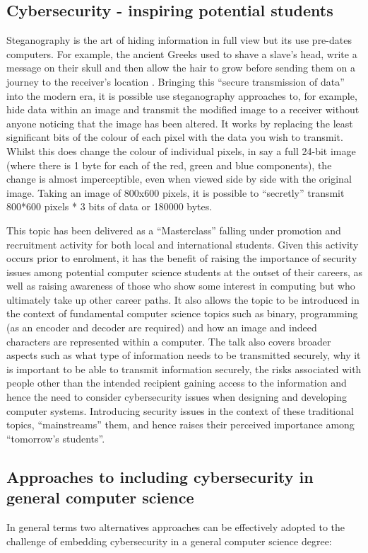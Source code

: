 \documentclass[conference]{IEEEtran}
\begin{document}
\subsection{Cybersecurity - inspiring potential students}\label{sec:third} %
Steganography is the art of hiding information in full view but its use pre-dates computers.  For example, the ancient Greeks used to shave a slave’s head, write a message on their skull and then allow the hair to grow before sending them on a journey to the receiver’s location \cite{Herodotus440}.  Bringing this ``secure transmission of data'' into the modern era, it is possible use steganography approaches to, for example, hide data within an image and transmit the modified image to a receiver without anyone noticing that the image has been altered.  It works by replacing the least significant bits of the colour of each pixel with the data you wish to transmit.  Whilst this does change the colour of individual pixels, in say a full 24-bit image (where there is 1 byte for each of the red, green and blue components), the change is almost imperceptible, even when viewed side by side with the original image.  Taking an image of 800x600 pixels, it is possible to ``secretly'' transmit 800*600 pixels * 3 bits of data or 180000 bytes.

This topic has been delivered as a ``Masterclass'' falling under promotion and recruitment activity for both local and international students.  Given this activity occurs prior to enrolment, it has the benefit of raising the importance of security issues among potential computer science students at the outset of their careers, as well as raising awareness of those who show some interest in computing but who ultimately take up other career paths.  It also allows the topic to be introduced in the context of fundamental computer science topics such as binary, programming (as an encoder and decoder are required) and how an image and indeed characters are represented within a computer.  The talk also covers broader aspects such as what type of information needs to be transmitted securely, why it is important to be able to transmit information securely, the risks associated with people other than the intended recipient gaining access to the information and hence the need to consider cybersecurity issues when designing and developing computer systems.  Introducing security issues in the context of these traditional topics, ``mainstreams'' them, and hence raises their perceived importance among ``tomorrow’s students''.

\subsection{Approaches to including cybersecurity in general computer science}
In general terms two alternatives approaches can be effectively adopted to the challenge of embedding cybersecurity in a general computer science degree:
\end{document}
